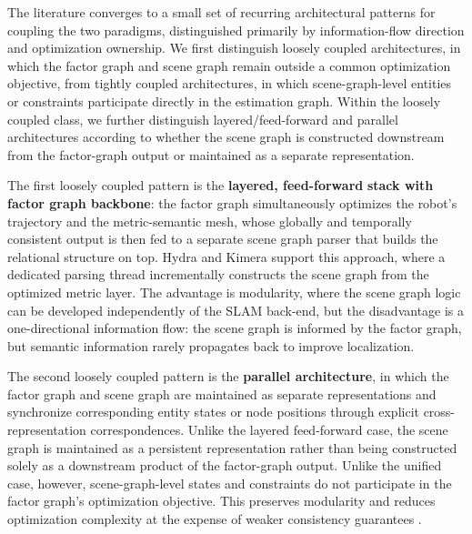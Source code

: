 The literature converges to a small set of recurring architectural patterns for coupling the two paradigms, distinguished primarily by information-flow direction and optimization ownership. 
We first distinguish loosely coupled architectures, in which the factor graph and scene graph remain outside a common optimization objective, from tightly coupled architectures, in which scene-graph-level entities or constraints participate directly in the estimation graph. 
Within the loosely coupled class, we further distinguish layered/feed-forward and parallel architectures according to whether the scene graph is constructed downstream from the factor-graph output or maintained as a separate representation.

The first loosely coupled pattern is the \textbf{layered, feed-forward} \textbf{stack with factor graph backbone}: the factor graph simultaneously optimizes the robot's trajectory and the metric-semantic mesh, whose globally and temporally consistent output is then fed to a separate scene graph parser that builds the relational structure on top. 
Hydra \cite{hughes_hydra_2022} and Kimera \cite{rosinol_kimera_2021} support this approach, where a dedicated parsing thread incrementally constructs the scene graph from the optimized metric layer. 
The advantage is modularity, where the scene graph logic can be developed independently of the SLAM back-end, but the disadvantage is a one-directional information flow: the scene graph is informed by the factor graph, but semantic information rarely propagates back to improve localization.

The second loosely coupled pattern is the  \textbf{parallel architecture}, in which  the factor graph and scene graph are maintained as separate representations   and synchronize corresponding entity states or node positions through explicit cross-representation correspondences. Unlike the layered feed-forward case, the scene graph is maintained as a persistent representation rather than being constructed solely as a downstream product of the factor-graph output. Unlike the unified case, however, scene-graph-level states and constraints do not participate in the factor graph's optimization objective. This preserves modularity and reduces optimization complexity at the expense of weaker consistency guarantees \cite{rosinol_3d_2020}.

